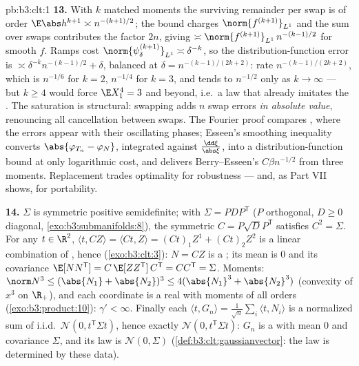 \begin{solution}{pb:b3:clt:1}
\textbf{13.} With $k$ matched moments the surviving
remainder per swap is of order $\E\abs h^{k+1} \asymp
n^{-(k+1)/2}$; the  bound charges
$\norm{f^{(k+1)}}_{L^1}$ and the sum over swaps contributes
the factor $2n$, giving $\asymp\norm{f^{(k+1)}}_{L^1}\,
n^{-(k-1)/2}$ for smooth $f$. Ramps cost
$\norm{\psi_\delta^{(k+1)}}_{L^1} \asymp \delta^{-k}$, so
the distribution-function error is $\asymp
\delta^{-k}n^{-(k-1)/2} + \delta$, balanced at $\delta =
n^{-(k-1)/(2k+2)}$: rate $n^{-(k-1)/(2k+2)}$, which is
$n^{-1/6}$ for $k = 2$, $n^{-1/4}$ for $k = 3$, and tends
to $n^{-1/2}$ only as $k \to \infty$ --- but $k \geq 4$
would force $\E X_1^4 = 3$ and beyond, i.e.\ a law that
already imitates the . The saturation is
structural: swapping adds $n$ swap errors \emph{in
absolute value}, renouncing all cancellation between
swaps. The Fourier proof compares ,
where the errors appear with their oscillating phases;
Esseen's smoothing inequality converts $\abs{\varphi_{T_n}
- \varphi_N}$, integrated against $\frac{\dd\xi}{\abs\xi}$,
into a distribution-function bound at only logarithmic
cost, and delivers Berry--Esseen's $C\beta n^{-1/2}$ from
three moments. Replacement trades optimality for
robustness --- and, as Part VII shows, for portability.

\textbf{14.} $\Sigma$ is symmetric positive semidefinite;
with $\Sigma = PDP^{\mathsf T}$ ($P$ orthogonal, $D \geq 0$
diagonal, \cref{exo:b3:submanifolds:8}), the symmetric $C =
P\sqrt DP^{\mathsf T}$ satisfies $C^2 = \Sigma$. For any $t
\in \R^2$, $\langle t, CZ\rangle = \langle Ct, Z\rangle =
(Ct)_1Z^1 + (Ct)_2Z^2$ is a linear combination of
 , hence 
(\cref{exo:b3:clt:3}): $N = CZ$ is a ; its
mean is $0$ and its covariance $\E[NN^{\mathsf T}] =
C\,\E[ZZ^{\mathsf T}]\,C^{\mathsf T} = CC^{\mathsf T} =
\Sigma$. Moments: $\norm N^3 \leq (\abs{N_1} +
\abs{N_2})^3 \leq 4(\abs{N_1}^3 + \abs{N_2}^3)$ (convexity
of $x^3$ on $\R_+$), and each coordinate is a real
 with moments of all orders
(\cref{exo:b3:product:10}): $\gamma' < \infty$. Finally
each $\langle t, G_n\rangle = \frac1{\sqrt
n}\sum_i\langle t, N_i\rangle$ is a normalized sum of
i.i.d.\ $\mathcal N(0, t^{\mathsf T}\Sigma t)$, hence
exactly $\mathcal N(0, t^{\mathsf T}\Sigma t)$: $G_n$ is a
 with mean $0$ and covariance $\Sigma$, and
its law is $\mathcal N(0, \Sigma)$
(\cref{def:b3:clt:gaussianvector}: the law is determined
by these data).


\end{solution}
